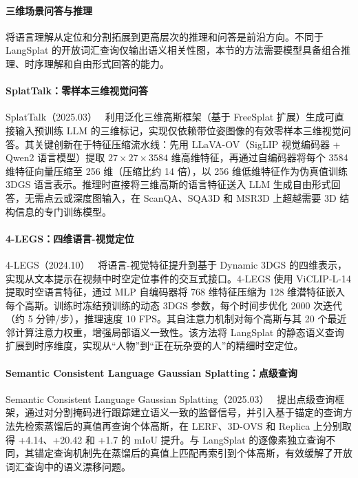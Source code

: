 \paragraph{三维场景问答与推理}

将语言理解从定位和分割拓展到更高层次的推理和问答是前沿方向。不同于 LangSplat 的开放词汇查询仅输出语义相关性图，本节的方法需要模型具备组合推理、时序理解和自由形式回答的能力。

\paragraph{SplatTalk：零样本三维视觉问答} SplatTalk（2025.03）~\cite{2503_06271} 利用泛化三维高斯框架（基于 FreeSplat 扩展）生成可直接输入预训练 LLM 的三维标记，实现仅依赖带位姿图像的有效零样本三维视觉问答。其关键创新在于特征压缩流水线：先用 LLaVA-OV（SigLIP 视觉编码器 + Qwen2 语言模型）提取 $27 \times 27 \times 3584$ 维高维特征，再通过自编码器将每个 3584 维特征向量压缩至 256 维（压缩比约 14 倍），以 256 维低维特征作为伪真值训练 3DGS 语言表示。推理时直接将三维高斯的语言特征送入 LLM 生成自由形式回答，无需点云或深度图输入，在 ScanQA、SQA3D 和 MSR3D 上超越需要 3D 结构信息的专门训练模型。

\paragraph{4-LEGS：四维语言-视觉定位} 4-LEGS（2024.10）~\cite{2410_10719} 将语言-视觉特征提升到基于 Dynamic 3DGS 的四维表示，实现从文本提示在视频中时空定位事件的交互式接口。4-LEGS 使用 ViCLIP-L-14 提取时空语言特征，通过 MLP 自编码器将 768 维特征压缩为 128 维潜特征嵌入每个高斯。训练时冻结预训练的动态 3DGS 参数，每个时间步优化 2000 次迭代（约 5 分钟/步），推理速度 10 FPS。其自注意力机制对每个高斯与其 20 个最近邻计算注意力权重，增强局部语义一致性。该方法将 LangSplat 的静态语义查询扩展到时序维度，实现从``人物''到``正在玩杂耍的人''的精细时空定位。

\paragraph{Semantic Consistent Language Gaussian Splatting：点级查询} Semantic Consistent Language Gaussian Splatting（2025.03）~\cite{2503_21767} 提出点级查询框架，通过对分割掩码进行跟踪建立语义一致的监督信号，并引入基于锚定的查询方法先检索蒸馏后的真值再查询个体高斯，在 LERF、3D-OVS 和 Replica 上分别取得 +4.14、+20.42 和 +1.7 的 mIoU 提升。与 LangSplat 的逐像素独立查询不同，其锚定查询机制先在蒸馏后的真值上匹配再索引到个体高斯，有效缓解了开放词汇查询中的语义漂移问题。

